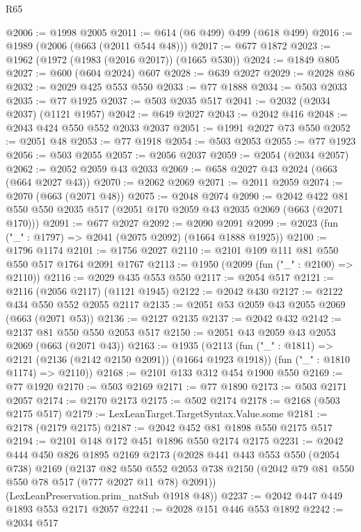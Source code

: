 \begin{lexlean}{R65}
\begin{coremodule}
@2006 := @1998 @2005
@2011 := @614 (@6 @499) @499 (@618 @499)
@2016 := @1989 (@2006 (@663 (@2011 @544 @48)))
@2017 := @677 @1872
@2023 := @1962 (@1972 (@1983 (@2016 @2017)) (@1665 @530))
@2024 := @1849 @805
@2027 := @600 (@604 @2024) @607
@2028 := @639 @2027
@2029 := @2028 @86
@2032 := @2029 @425 @553 @550
@2033 := @77 @1888
@2034 := @503 @2033
@2035 := @77 @1925
@2037 := @503 @2035 @517
@2041 := @2032 (@2034 @2037) (@1121 @1957)
@2042 := @649 @2027
@2043 := @2042 @416
@2048 := @2043 @424 @550 @552 @2033 @2037
@2051 := @1991 @2027 @73 @550
@2052 := @2051 @48
@2053 := @77 @1918
@2054 := @503 @2053
@2055 := @77 @1923
@2056 := @503 @2055
@2057 := @2056 @2037
@2059 := @2054 (@2034 @2057)
@2062 := @2052 @2059 @43 @2033
@2069 := @658 @2027 @43 @2024 (@663 (@664 @2027 @43))
@2070 := @2062 @2069
@2071 := @2011 @2059
@2074 := @2070 (@663 (@2071 @48))
@2075 := @2048 @2074
@2090 := @2042 @422 @81 @550 @550 @2035 @517 (@2051 @170 @2059 @43 @2035 @2069 (@663 (@2071 @170)))
@2091 := @677 @2027
@2092 := @2090 @2091
@2099 := @2023 (fun ("_" : @1797) => @2041 (@2075 @2092) (@1664 @1888 @1925))
@2100 := @1796 @1174
@2101 := @1756 @2027
@2110 := @2101 @109 @111 @81 @550 @550 @517 @1764 @2091 @1767
@2113 := @1950 (@2099 (fun ("_" : @2100) => @2110))
@2116 := @2029 @435 @553 @550
@2117 := @2054 @517
@2121 := @2116 (@2056 @2117) (@1121 @1945)
@2122 := @2042 @430
@2127 := @2122 @434 @550 @552 @2055 @2117
@2135 := @2051 @53 @2059 @43 @2055 @2069 (@663 (@2071 @53))
@2136 := @2127 @2135
@2137 := @2042 @432
@2142 := @2137 @81 @550 @550 @2053 @517
@2150 := @2051 @43 @2059 @43 @2053 @2069 (@663 (@2071 @43))
@2163 := @1935
    (@2113
      (fun ("_" : @1811) => @2121 (@2136 (@2142 @2150 @2091)) (@1664 @1923 @1918))
      (fun ("_" : @1810 @1174) => @2110))
@2168 := @2101 @133 @312 @454 @1900 @550
@2169 := @77 @1920
@2170 := @503 @2169
@2171 := @77 @1890
@2173 := @503 @2171 @2057
@2174 := @2170 @2173
@2175 := @502 @2174
@2178 := @2168 (@503 @2175 @517)
@2179 := LexLeanTarget.TargetSyntax.Value.some
@2181 := @2178 (@2179 @2175)
@2187 := @2042 @452 @81 @1898 @550 @2175 @517
@2194 := @2101 @148 @172 @451 @1896 @550 @2174 @2175
@2231 := @2042
    @444
    @450
    @826
    @1895
    @2169
    @2173
    (@2028
      @441
      @443
      @553
      @550
      (@2054 @738)
      @2169
      (@2137
        @82
        @550
        @552
        @2053
        @738
        @2150
        (@2042 @79 @81 @550 @550 @78 @517 (@777 @2027 @11 @78) @2091))
      (LexLeanPreservation.prim_natSub @1918 @48))
@2237 := @2042 @447 @449 @1893 @553 @2171 @2057
@2241 := @2028 @151 @446 @553 @1892
@2242 := @2034 @517

\end{coremodule}
\end{lexlean}
